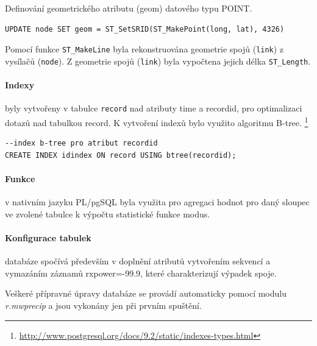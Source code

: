 \documentclass[a4paper,12pt,oneside]{report}
\begin{document}
Definování geometrického atributu (geom) datového typu POINT. 

\begin{footnotesize}
\begin{lstlisting}[style=mybash]
UPDATE node SET geom = ST_SetSRID(ST_MakePoint(long, lat), 4326)
\end{lstlisting}
\end{footnotesize}

Pomocí funkce \texttt{ST\_MakeLine} byla rekonstruována geometrie spojů (\texttt{link}) z vysílačů (\texttt{node}). Z geometrie spojů (\texttt{link}) byla vypočtena jejich délka \texttt{ST\_Length}.

\paragraph*{Indexy} byly vytvořeny v tabulce \texttt{record} nad atributy time a recordid, pro optimalizaci dotazů nad tabulkou record. K vytvoření indexů bylo využito algoritmu B-tree. \footnote{\url{http://www.postgresql.org/docs/9.2/static/indexes-types.html}}

\begin{footnotesize}
\begin{lstlisting}[style=mybash]
--index b-tree pro atribut recordid
CREATE INDEX idindex ON record USING btree(recordid);		
\end{lstlisting}
\end{footnotesize}

\paragraph*{Funkce} v nativním jazyku PL/pgSQL byla využita pro agregaci hodnot pro daný sloupec ve zvolené tabulce k výpočtu statistické funkce modus.

\paragraph*{Konfigurace tabulek} databáze spočívá především v doplnění atributů vytvořením sekvencí a vymazáním záznamů rxpower=-99.9, které charakterizují výpadek spoje. 

\bigskip

Veškeré přípravné úpravy databáze se provádí automaticky pomocí modulu \textit{r.mwprecip} a jsou vykonány jen při prvním spuštění. 
\end{document}
